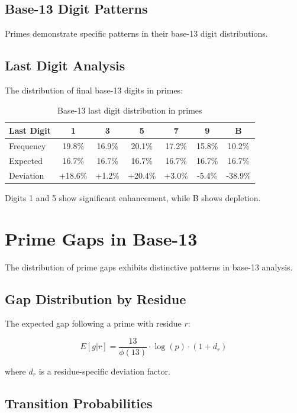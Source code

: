 \documentclass[12pt,a4paper]{report}
\begin{document}
\subsection{Base-13 Digit Patterns}

Primes demonstrate specific patterns in their base-13 digit distributions.

\subsection{Last Digit Analysis}

The distribution of final base-13 digits in primes:

\begin{table}[h]
\centering
\begin{tabular}{|l|c|c|c|c|c|c|}
\hline
\textbf{Last Digit} & 1 & 3 & 5 & 7 & 9 & B \\
\hline
Frequency & 19.8\% & 16.9\% & 20.1\% & 17.2\% & 15.8\% & 10.2\% \\
Expected & 16.7\% & 16.7\% & 16.7\% & 16.7\% & 16.7\% & 16.7\% \\
Deviation & +18.6\% & +1.2\% & +20.4\% & +3.0\% & -5.4\% & -38.9\% \\
\hline
\end{tabular}
\caption{Base-13 last digit distribution in primes}
\end{table}

Digits 1 and 5 show significant enhancement, while B shows depletion.

\section{Prime Gaps in Base-13}

The distribution of prime gaps exhibits distinctive patterns in base-13 analysis.

\subsection{Gap Distribution by Residue}

The expected gap following a prime with residue $r$:

\[
E[g|r] = \frac{13}{\phi(13)} \cdot \log(p) \cdot (1 + d_r)
\]

where $d_r$ is a residue-specific deviation factor.

\subsection{Transition Probabilities}
\end{document}
